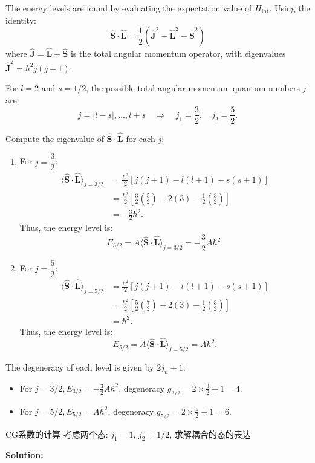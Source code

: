 The energy levels are found by evaluating the expectation value of $H_{\text{int}}$. Using the identity:
\[
\hat{\mathbf{S}} \cdot \hat{\mathbf{L}} = \frac{1}{2} (\hat{\mathbf{J}}^2 - \hat{\mathbf{L}}^2 - \hat{\mathbf{S}}^2)
\]
where $\hat{\mathbf{J}} = \hat{\mathbf{L}} + \hat{\mathbf{S}}$ is the total angular momentum operator, with eigenvalues $\hat{\mathbf{J}}^2 = \hbar^2 j(j+1)$.

For $l=2$ and $s=1/2$, the possible total angular momentum quantum numbers $j$ are:
\[
j = |l-s|, \ldots, l+s \quad \Rightarrow \quad j_1 = \frac{3}{2}, \quad j_2 = \frac{5}{2}.
\]

Compute the eigenvalue of $\hat{\mathbf{S}} \cdot \hat{\mathbf{L}}$ for each $j$:

\begin{enumerate}[label=(\arabic*)]
	\item For $j = \dfrac{3}{2}$:
	\begin{align*}
		\langle \hat{\mathbf{S}} \cdot \hat{\mathbf{L}} \rangle_{j=3/2} 
		&= \frac{\hbar^2}{2} \left[ j(j+1) - l(l+1) - s(s+1) \right] \\
		&= \frac{\hbar^2}{2} \left[ \frac{3}{2}\left(\frac{5}{2}\right) - 2(3) - \frac{1}{2}\left(\frac{3}{2}\right) \right] \\
		&= -\frac{3}{2}\hbar^2.
	\end{align*}
	Thus, the energy level is:
	\[
	E_{3/2} = A \langle \hat{\mathbf{S}} \cdot \hat{\mathbf{L}} \rangle_{j=3/2} = -\frac{3}{2} A \hbar^2.
	\]
	
	\item For $j = \dfrac{5}{2}$:
	\begin{align*}
		\langle \hat{\mathbf{S}} \cdot \hat{\mathbf{L}} \rangle_{j=5/2} 
		&= \frac{\hbar^2}{2} \left[ j(j+1) - l(l+1) - s(s+1) \right] \\
		&= \frac{\hbar^2}{2} \left[ \frac{5}{2}\left(\frac{7}{2}\right) - 2(3) - \frac{1}{2}\left(\frac{3}{2}\right) \right] \\
		&= \hbar^2.
	\end{align*}
	Thus, the energy level is:
	\[
	E_{5/2} = A \langle \hat{\mathbf{S}} \cdot \hat{\mathbf{L}} \rangle_{j=5/2} = A \hbar^2.
	\]
\end{enumerate}

The degeneracy of each level is given by $ 2j_n + 1$:
\begin{itemize}
	\item For $\displaystyle j = 3/2, E_{3/2} = -\frac{3}{2} A \hbar^2$, degeneracy $g_{3/2} = 2 \times \frac{3}{2} + 1 = 4$.
	\item For $j = 5/2, E_{5/2} = A \hbar^2$, degeneracy $g_{5/2} = 2 \times \frac{5}{2} + 1 = 6$.
\end{itemize}
\begin{problembox}{CG系数的计算}
	考虑两个态: \(j_1 = 1\), \(j_2 = 1/2\), 求解耦合的态的表达
\end{problembox}
\textbf{Solution:}

